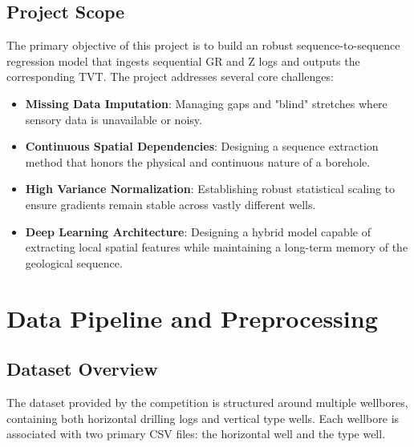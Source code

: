 \documentclass[12pt, a4paper]{article}
\begin{document}
    \subsection{Project Scope}
    The primary objective of this project is to build an robust sequence-to-sequence regression model that ingests sequential GR and Z logs and outputs the corresponding TVT.
    The project addresses several core challenges:
    \begin{itemize}
        \item \textbf{Missing Data Imputation}: Managing gaps and "blind" stretches where sensory data is unavailable or noisy.
        \item \textbf{Continuous Spatial Dependencies}: Designing a sequence extraction method that honors the physical and continuous nature of a borehole.
        \item \textbf{High Variance Normalization}: Establishing robust statistical scaling to ensure gradients remain stable across vastly different wells.
        \item \textbf{Deep Learning Architecture}: Designing a hybrid model capable of extracting local spatial features while maintaining a long-term memory of the geological sequence.
    \end{itemize}

    \section{Data Pipeline and Preprocessing}

    \subsection{Dataset Overview}
    The dataset provided by the competition is structured around multiple wellbores, containing both horizontal drilling logs and vertical type wells. Each wellbore is associated with two primary CSV files: the horizontal well and the type well.
\end{document}
